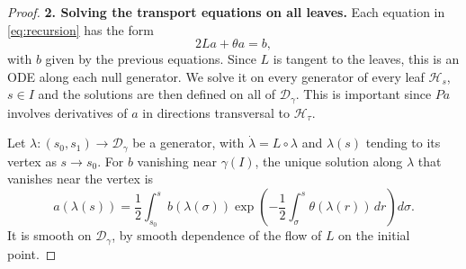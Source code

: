 \documentclass[12pt,reqno]{amsart}
\numberwithin{equation}{section}
\theoremstyle{definition}
\theoremstyle{plain}
\theoremstyle{definition}
\theoremstyle{definition}
\newcommand{\D}{\mathcal{D}}
\newcommand{\dg}{\D_\gamma}
\begin{document}
\begin{proof}
\medskip\noindent
\textbf{2. Solving the transport equations on all leaves.}
Each equation in \eqref{eq:recursion} has the form
\begin{equation*}
2La+\theta a=b,
\end{equation*}
with $b$ given by the previous equations. Since $L$ is tangent to the leaves, this is an ODE along each null generator. We solve it on every generator of every leaf $\mathcal H_s$, $s\in I$ and the solutions are then defined on all of $\dg$. This is important since $Pa$ involves derivatives of $a$ in directions transversal to $\mathcal H_\tau$.

Let $\lambda\colon(s_0,s_1)\to\dg$ be a generator, with $\dot\lambda=L\circ\lambda$ and $\lambda(s)$ tending to its vertex as $s\to s_0$. For $b$ vanishing near $\gamma(I)$, the unique solution along $\lambda$ that vanishes near the vertex is
\begin{equation}
  a(\lambda(s))
  =
  \frac{1}{2}
  \int_{s_0}^{s}
  b(\lambda(\sigma))
  \exp\!\left(
  -\frac{1}{2}\int_\sigma^s\theta(\lambda(r))\,dr
  \right)
  d\sigma .
  \label{eq:alpha-explicit}
\end{equation}
It is smooth on $\dg$, by smooth dependence of the flow of $L$ on the initial point.


\end{proof}
\end{document}
